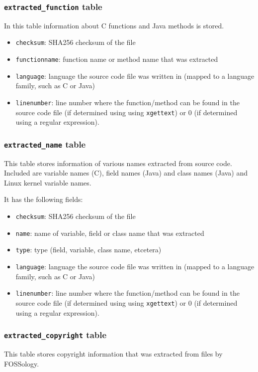 \documentclass[10pt,a4paper]{article}
\begin{document}
\subsubsection{\texttt{extracted\_function} table}

In this table information about C functions and Java methods is stored.

\begin{itemize}
\item \texttt{checksum}: SHA256 checksum of the file
\item \texttt{functionname}: function name or method name that was extracted
\item \texttt{language}: language the source code file was written in (mapped
to a language family, such as C or Java)
\item \texttt{linenumber}: line number where the function/method can be found
in the source code file (if determined using using \texttt{xgettext}) or $0$
(if determined using a regular expression).
\end{itemize}

\subsubsection{\texttt{extracted\_name} table}
This table stores information of various names extracted from source code.
Included are variable names (C), field names (Java) and class names (Java) and
Linux kernel variable names.

It has the following fields:

\begin{itemize}
\item \texttt{checksum}: SHA256 checksum of the file
\item \texttt{name}: name of variable, field or class name that was extracted
\item \texttt{type}: type (field, variable, class name, etcetera)
\item \texttt{language}: language the source code file was written in (mapped
to a language family, such as C or Java)
\item \texttt{linenumber}: line number where the function/method can be found
in the source code file (if determined using using \texttt{xgettext}) or $0$
(if determined using a regular expression).
\end{itemize}

\subsubsection{\texttt{extracted\_copyright} table}
This table stores copyright information that was extracted from files by
FOSSology.
\end{document}
